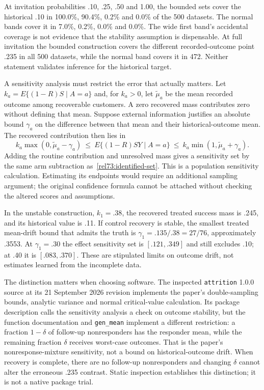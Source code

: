 At invitation probabilities .10, .25, .50 and 1.00, the bounded sets cover
the historical .10 in 100.0\%, 90.4\%, 0.2\% and 0.0\% of the 500
datasets. The normal bands cover it in 7.0\%, 0.2\%, 0.0\% and 0.0\%.
The wide first band's accidental coverage is not evidence that the stability
assumption is dispensable. At full invitation the bounded construction
covers the different recorded-outcome point .235 in all 500 datasets,
while the normal band covers it in 472. Neither statement validates
inference for the historical target.

A sensitivity analysis must restrict the error that actually matters.
Let $k_a=E\{(1-R)S\mid A=a\}$ and, for $k_a>0$, let
$\widetilde\mu_a$ be the mean recorded outcome among recoverable customers.
A zero recovered mass contributes zero without defining that mean.
Suppose external information
justifies an absolute bound $\gamma_a$ on the difference between that mean
and their historical-outcome mean. The recovered contribution then lies in
\[
 k_a\max(0,\widetilde\mu_a-\gamma_a)
 \ \leq\ E\{(1-R)SY\mid A=a\}\ \leq\
 k_a\min(1,\widetilde\mu_a+\gamma_a).
\]
Adding the routine contribution and unresolved mass gives a sensitivity set
by the same arm subtraction as~\eqref{rel73:identified-set}. This is a
population sensitivity calculation. Estimating its endpoints would require
an additional sampling argument; the original confidence formula cannot be
attached without checking the altered scores and assumptions.

In the unstable construction, $k_1=.38$, the recovered treated success mass
is .245, and its historical value is .11. If control recovery is stable,
the smallest treated mean-drift bound that admits the truth is
$\gamma_1=.135/.38=27/76$, approximately .3553. At $\gamma_1=.30$ the
effect sensitivity set is $[.121,.349]$ and still excludes .10; at .40 it
is $[.083,.370]$. These are stipulated limits on outcome drift, not estimates
learned from the incomplete data.

The distinction matters when choosing software. The inspected
\texttt{attrition} 1.0.0 source at its 21 September 2026 revision implements
the paper's double-sampling bounds, analytic variance and normal critical-value
calculation. Its package description calls the sensitivity analysis a check
on outcome stability, but the function documentation and
\texttt{gen\_mean} implement a different restriction: a fraction $1-\delta$
of follow-up nonresponders has the responder mean, while the remaining
fraction $\delta$ receives worst-case outcomes. That is the paper's
nonresponse-mixture sensitivity, not a bound on historical-outcome drift.
When recovery is complete, there are no follow-up nonresponders and changing
$\delta$ cannot alter the erroneous .235 contrast. Static inspection
establishes this distinction; it is not a native package trial.
\citep{rel73attrition,rel73coppock2017}

